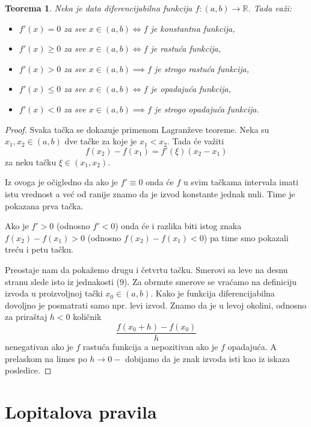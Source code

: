 \documentclass[a4paper,12pt]{article}
\theoremstyle{plain}
\newtheorem{theorem}{Teorema}[section]
\theoremstyle{definition}
\theoremstyle{remark}
\begin{document}
\begin{theorem}
Neka je data diferencijabilna funkcija $f: (a, b) \to \mathbb{R}$. Tada važi:
\begin{itemize}
    \item $f'(x) = 0$ za sve $x \in (a, b) \iff f$ je konstantna funkcija,
    \item $f'(x) \geq 0$ za sve $x \in (a, b) \iff f$ je rastuća funkcija,
    \item $f'(x) > 0$ za sve $x \in (a, b) \implies f$ je strogo rastuća funkcija,
    \item $f'(x) \leq 0$ za sve $x \in (a, b) \iff f$ je opadajuća funkcija,
    \item $f'(x) < 0$ za sve $x \in (a, b) \implies f$ je strogo opadajuća funkcija.
\end{itemize}
\end{theorem}

\begin{proof}
Svaka tačka se dokazuje primenom Lagranževe teoreme. Neka su $x_1, x_2 \in (a, b)$ dve tačke za koje je $x_1 < x_2$. Tada će važiti
\begin{equation}
    f(x_2) - f(x_1) = f'(\xi)(x_2 - x_1)
\end{equation}
za neku tačku $\xi \in (x_1, x_2)$.

Iz ovoga je očigledno da ako je $f' \equiv 0$ onda će $f$ u svim tačkama intervala imati istu vrednost a već od ranije znamo da je izvod konstante jednak nuli. Time je pokazana prva tačka.

Ako je $f' > 0$ (odnosno $f' < 0$) onda će i razlika biti istog znaka $f(x_2) - f(x_1) > 0$ (odnosno $f(x_2) - f(x_1) < 0$) pa time smo pokazali treću i petu tačku.

Preostaje nam da pokažemo drugu i četvrtu tačku. Smerovi sa leve na desnu stranu slede isto iz jednakosti (9). Za obrnute smerove se vraćamo na definiciju izvoda u proizvoljnoj tački $x_0 \in (a, b)$. Kako je funkcija diferencijabilna dovoljno je posmatrati samo npr. levi izvod. Znamo da je u levoj okolini, odnosno za priraštaj $h < 0$ količnik
$$
\frac{f(x_0 + h) - f(x_0)}{h}
$$
nenegativan ako je $f$ rastuća funkcija a nepozitivan ako je $f$ opadajuća. A prelaskom na limes po $h \to 0-$ dobijamo da je znak izvoda isti kao iz iskaza posledice.
\end{proof}

\section{Lopitalova pravila}
\end{document}
